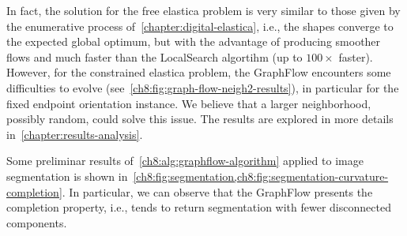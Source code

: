 In fact, the solution for the free elastica problem is very similar to those given by the enumerative process of~\cref{chapter:digital-elastica}, i.e., the shapes converge to the expected global optimum, but with the advantage of producing smoother flows and much faster than the LocalSearch algortihm (up to $100 \times$ faster). However, for the constrained elastica problem, the GraphFlow encounters some difficulties to evolve (see~\cref{ch8:fig:graph-flow-neigh2-results}), in particular for the fixed endpoint orientation instance. We believe that a larger neighborhood, possibly random, could solve this issue. The results are explored in more details in~\cref{chapter:results-analysis}.

Some preliminar results of~\cref{ch8:alg:graphflow-algorithm} applied to image segmentation is shown in~\cref{ch8:fig:segmentation,ch8:fig:segmentation-curvature-completion}. In particular, we can observe that the GraphFlow presents the completion property, i.e., tends to return segmentation with fewer disconnected components.

